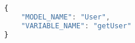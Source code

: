 \begin{lstlisting}[language=Javascript,caption={Contoh Aset Dinamis}]
{
    "MODEL_NAME": "User",
    "VARIABLE_NAME": "getUser"
}
\end{lstlisting}